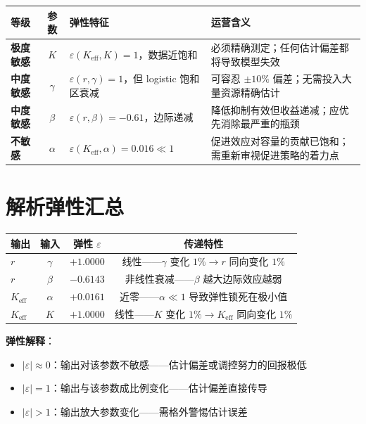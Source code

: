 \documentclass[12pt,a4paper]{article}
\begin{document}
\begin{center}
\begin{tabular}{lcll}
\toprule
等级 & 参数 & 弹性特征 & 运营含义 \\
\midrule
\textbf{极度敏感} & $K$ &
  $\varepsilon(K_{\text{eff}}, K)=1$，数据近饱和 &
  必须精确测定；任何估计偏差都将导致模型失效 \\
\textbf{中度敏感} & $\gamma$ &
  $\varepsilon(r, \gamma)=1$，但 logistic 饱和区衰减 &
  可容忍 $\pm 10\%$ 偏差；无需投入大量资源精确估计 \\
\textbf{中度敏感} & $\beta$ &
  $\varepsilon(r, \beta)=-0.61$，边际递减 &
  降低抑制有效但收益递减；应优先消除最严重的瓶颈 \\
\textbf{不敏感} & $\alpha$ &
  $\varepsilon(K_{\text{eff}}, \alpha)=0.016 \ll 1$ &
  促进效应对容量的贡献已饱和；需重新审视促进策略的着力点 \\
\bottomrule
\end{tabular}
\end{center}

\section{解析弹性汇总}

\begin{center}
\begin{tabular}{lccc}
\toprule
输出 & 输入 & 弹性 $\varepsilon$ & 传递特性 \\
\midrule
$r$ & $\gamma$ & $+1.0000$ & 线性——$\gamma$ 变化 $1\% \to r$ 同向变化 $1\%$ \\
$r$ & $\beta$  & $-0.6143$ & 非线性衰减——$\beta$ 越大边际效应越弱 \\
$K_{\text{eff}}$ & $\alpha$ & $+0.0161$ & 近零——$\alpha \ll 1$ 导致弹性锁死在极小值 \\
$K_{\text{eff}}$ & $K$      & $+1.0000$ & 线性——$K$ 变化 $1\% \to K_{\text{eff}}$ 同向变化 $1\%$ \\
\bottomrule
\end{tabular}
\end{center}

\textbf{弹性解释}：
\begin{itemize}
  \item $|\varepsilon| \approx 0$：输出对该参数不敏感——估计偏差或调控努力的回报极低
  \item $|\varepsilon| = 1$：输出与该参数成比例变化——估计偏差直接传导
  \item $|\varepsilon| > 1$：输出放大参数变化——需格外警惕估计误差
\end{itemize}
\end{document}
